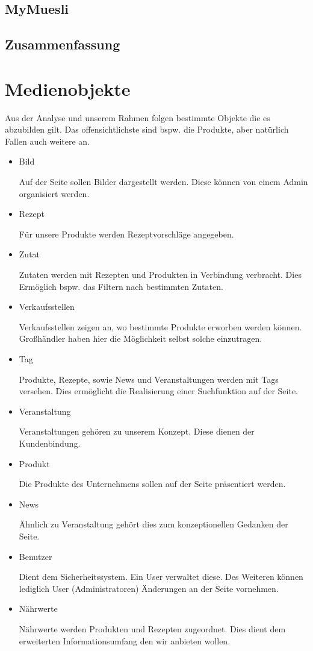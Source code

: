 \documentclass[12pt,a4paper,oneside,ngerman]{article}
\begin{document}
\subsection{MyMuesli}

\subsection{Zusammenfassung}


\section{Medienobjekte}
Aus der Analyse und unserem Rahmen folgen bestimmte Objekte die es abzubilden gilt. Das offensichtlichste sind bspw. die Produkte, aber natürlich Fallen auch weitere an.
\begin{itemize}
\item Bild

Auf der Seite sollen Bilder dargestellt werden. Diese können von einem Admin organisiert werden.

\item Rezept

Für unsere Produkte werden Rezeptvorschläge angegeben.

\item Zutat

Zutaten werden mit Rezepten und Produkten in Verbindung verbracht. Dies Ermöglich bspw. das Filtern nach bestimmten Zutaten.

\item Verkaufsstellen

Verkaufsstellen zeigen an, wo bestimmte Produkte erworben werden können. Großhändler haben hier die Möglichkeit selbst solche einzutragen.

\item Tag

Produkte, Rezepte, sowie News und Veranstaltungen werden mit Tags versehen. Dies ermöglicht die Realisierung einer Suchfunktion auf der Seite.

\item Veranstaltung

Veranstaltungen gehören zu unserem Konzept. Diese dienen der Kundenbindung.

\item Produkt

Die Produkte des Unternehmens sollen auf der Seite präsentiert werden.

\item News

Ähnlich zu Veranstaltung gehört dies zum konzeptionellen Gedanken der Seite.

\item Benutzer

Dient dem Sicherheitssystem. Ein User verwaltet diese. Des Weiteren können lediglich User (Administratoren) Änderungen an der Seite vornehmen.

\item Nährwerte

Nährwerte werden Produkten und Rezepten zugeordnet. Dies dient dem erweiterten Informationsumfang den wir anbieten wollen.

\end{itemize}
\end{document}
